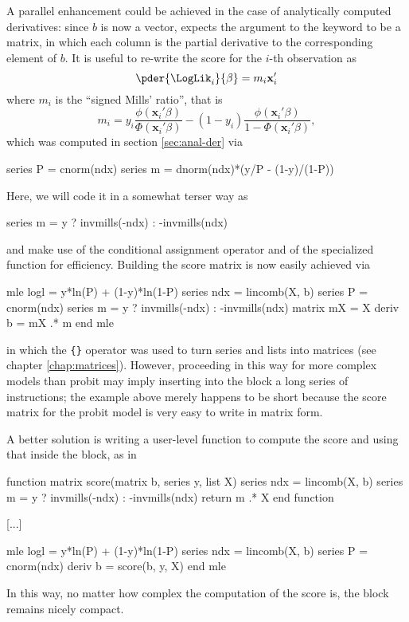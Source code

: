 A parallel enhancement could be achieved in the case of analytically
computed derivatives: since $b$ is now a vector,  expects the
argument to the  keyword to be a matrix, in which each
column is the partial derivative to the corresponding element of
$b$. It is useful to re-write the score for the $i$-th observation as
\begin{equation}
  \label{eq:mle-probscore}
  \pder{\LogLik_i}{\beta} = m_i \mathbf{x}_i'
\end{equation}
where $m_i$ is the ``signed Mills' ratio'', that is 
\[
m_i = y_i \frac{\phi(\mathbf{x}_i'\beta)}{\Phi(\mathbf{x}_i'\beta)} - 
(1-y_i) \frac{\phi(\mathbf{x}_i'\beta)}{1 - \Phi(\mathbf{x}_i'\beta)} ,
\]
which was computed in section \ref{sec:anal-der} via
\begin{code}
  series P = cnorm(ndx)
  series m = dnorm(ndx)*(y/P - (1-y)/(1-P))
\end{code}
Here, we will code it in a somewhat terser way as
\begin{code}
  series m = y ? invmills(-ndx) : -invmills(ndx)
\end{code}
and make use of the conditional assignment operator and of the
specialized function  for efficiency.  Building the
score matrix is now easily achieved via
\begin{code}
mle logl = y*ln(P) + (1-y)*ln(1-P)
    series ndx = lincomb(X, b)
    series P = cnorm(ndx)
    series m = y ? invmills(-ndx) : -invmills(ndx)
    matrix mX = {X}
    deriv b = mX .* {m}
end mle
\end{code}
in which the \verb|{}| operator was used to turn series and lists into
matrices (see chapter \ref{chap:matrices}). However, proceeding in
this way for more complex models than probit may imply inserting into
the  block a long series of instructions; the example above
merely happens to be short because the score matrix for the probit
model is very easy to write in matrix form.

A better solution is writing a user-level function to compute the
score and using that inside the  block, as in
\begin{code}
function matrix score(matrix b, series y, list X)
    series ndx = lincomb(X, b)
    series m = y ? invmills(-ndx) : -invmills(ndx)
    return {m} .* {X}
end function
    
[...]

mle logl = y*ln(P) + (1-y)*ln(1-P)
    series ndx = lincomb(X, b)
    series P = cnorm(ndx)
    deriv b = score(b, y, X)
end mle
\end{code}
In this way, no matter how complex the computation of the score is,
the  block remains nicely compact.

